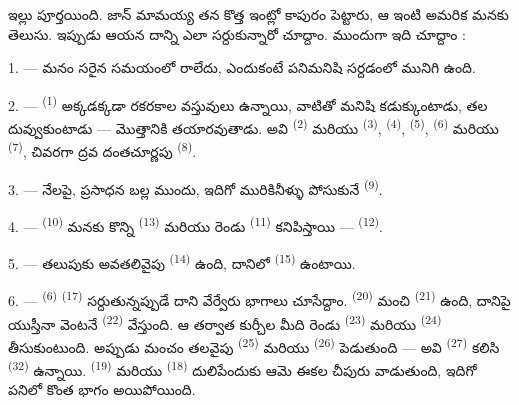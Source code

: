 \VUsaut{6.0mm}
\VUsaut{1.4mm}
\VUsaut{0.4mm}
\VUsaut{2.2mm}

ఇల్లు పూర్తయింది. జాన్ మామయ్య తన కొత్త ఇంట్లో కాపురం పెట్టారు, ఆ ఇంటి అమరిక మనకు తెలుసు.
ఇప్పుడు ఆయన దాన్ని ఎలా సర్దుకున్నారో చూద్దాం. ముందుగా ఇది చూద్దాం :

\VUsaut{3.0mm}

1. --- మనం సరైన సమయంలో రాలేదు, ఎందుకంటే పనిమనిషి  సర్దడంలో మునిగి ఉంది.

2. ---  \textsuperscript{(1)} అక్కడక్కడా రకరకాల వస్తువులు ఉన్నాయి,
వాటితో మనిషి కడుక్కుంటాడు, తల దువ్వుకుంటాడు — మొత్తానికి తయారవుతాడు. అవి 
\textsuperscript{(2)} మరియు  \textsuperscript{(3)}, 
\textsuperscript{(4)},  \textsuperscript{(5)}, 
\textsuperscript{(6)} మరియు  \textsuperscript{(7)}, చివరగా ద్రవ దంతచూర్ణపు
 \textsuperscript{(8)}.

3. --- నేలపై, ప్రసాధన బల్ల ముందు, ఇదిగో మురికినీళ్ళు పోసుకునే 
\textsuperscript{(9)}.

4. ---  \textsuperscript{(10)} మనకు కొన్ని 
\textsuperscript{(13)} మరియు రెండు  \textsuperscript{(11)} కనిపిస్తాయి —
 \textsuperscript{(12)}.

5. --- తలుపుకు అవతలివైపు  \textsuperscript{(14)} ఉంది, దానిలో
 \textsuperscript{(15)} ఉంటాయి.

6. ---  \textsuperscript{(6)}  \textsuperscript{(17)}
సర్దుతున్నప్పుడే దాని వేర్వేరు భాగాలు చూసేద్దాం.  \textsuperscript{(20)}
మంచి  \textsuperscript{(21)} ఉంది, దానిపై యుస్తీనా వెంటనే
 \textsuperscript{(22)} వేస్తుంది. ఆ తర్వాత కుర్చీల మీది రెండు
 \textsuperscript{(23)} మరియు 
\textsuperscript{(24)} తీసుకుంటుంది. అప్పుడు మంచం తలవైపు 
\textsuperscript{(25)} మరియు  \textsuperscript{(26)} పెడుతుంది — అవి
 \textsuperscript{(27)} కలిసి 
\textsuperscript{(32)} ఉన్నాయి.  \textsuperscript{(19)} మరియు
 \textsuperscript{(18)} దులిపేందుకు ఆమె ఈకల చీపురు వాడుతుంది, ఇదిగో పనిలో
కొంత భాగం అయిపోయింది.

